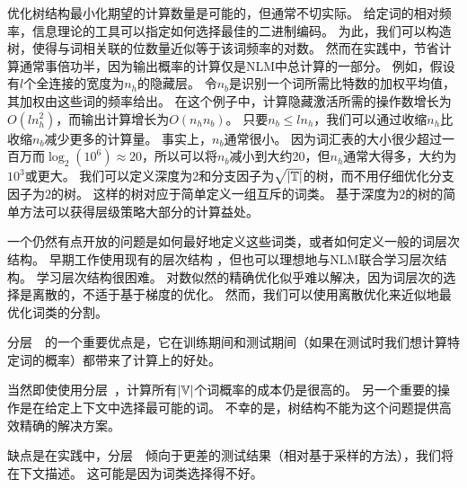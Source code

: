 优化树结构最小化期望的计算数量是可能的，但通常不切实际。
给定词的相对频率，信息理论的工具可以指定如何选择最佳的二进制编码。
为此，我们可以构造树，使得与词相关联的位数量近似等于该词频率的对数。
然而在实践中，节省计算通常事倍功半，因为输出概率的计算仅是\gls{NLM}中总计算的一部分。
例如，假设有$l$个全连接的宽度为$n_h$的隐藏层。
令$n_b$是识别一个词所需比特数的加权平均值，其加权由这些词的频率给出。
在这个例子中，计算隐藏激活所需的操作数增长为$O(ln_h^2)$，而输出计算增长为$O(n_h n_b)$。
只要$ n_b \leq l n_h$，我们可以通过收缩$n_h$比收缩$n_b$减少更多的计算量。
事实上，$n_b$通常很小。
因为词汇表的大小很少超过一百万而$\log_ 2(10^6) \approx 20$，所以可以将$n_b$减小到大约20，但$n_h$通常大得多，大约为$10^3$或更大。
我们可以定义深度为2和分支因子为$\sqrt{|\mathbb{T}|}$的树，而不用仔细优化分支因子为$2$的树。
这样的树对应于简单定义一组互斥的词类。
基于深度为$2$的树的简单方法可以获得层级策略大部分的计算益处。


一个仍然有点开放的问题是如何最好地定义这些词类，或者如何定义一般的词层次结构。
早期工作使用现有的层次结构\citep{Morin+Bengio-2005-small} ，但也可以理想地与\gls{NLM}联合学习层次结构。
学习层次结构很困难。
对数似然的精确优化似乎难以解决，因为词层次的选择是离散的，不适于基于梯度的优化。
然而，我们可以使用离散优化来近似地最优化词类的分割。

分层~~的一个重要优点是，它在训练期间和测试期间（如果在测试时我们想计算特定词的概率）都带来了计算上的好处。

当然即使使用分层~，计算所有$|\mathbb{V}|$个词概率的成本仍是很高的。
另一个重要的操作是在给定上下文中选择最可能的词。
不幸的是，树结构不能为这个问题提供高效精确的解决方案。

缺点是在实践中，分层~~倾向于更差的测试结果（相对基于采样的方法），我们将在下文描述。
这可能是因为词类选择得不好。


